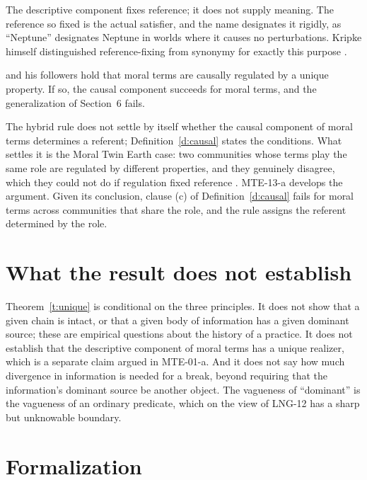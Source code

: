 \documentclass{situationist-preprint}
\begin{document}
\begin{reply}
The descriptive component fixes reference; it does not supply meaning. The reference so fixed is the actual satisfier, and the name designates it rigidly, as \enquote{Neptune} designates Neptune in worlds where it causes no perturbations. Kripke himself distinguished reference-fixing from synonymy for exactly this purpose \citep[Lecture~I]{Kripke1980}.
\end{reply}

\begin{objection}
\citet{Boyd1988} and his followers hold that moral terms are causally regulated by a unique property. If so, the causal component succeeds for moral terms, and the generalization of Section~6 fails.
\end{objection}

\begin{reply}
The hybrid rule does not settle by itself whether the causal component of moral terms determines a referent; Definition~\ref{d:causal} states the conditions. What settles it is the Moral Twin Earth case: two communities whose terms play the same role are regulated by different properties, and they genuinely disagree, which they could not do if regulation fixed reference \citep{HorganTimmons1991}. MTE-13-a develops the argument. Given its conclusion, clause (c) of Definition~\ref{d:causal} fails for moral terms across communities that share the role, and the rule assigns the referent determined by the role.
\end{reply}

\section{What the result does not establish}

Theorem~\ref{t:unique} is conditional on the three principles. It does not show that a given chain is intact, or that a given body of information has a given dominant source; these are empirical questions about the history of a practice. It does not establish that the descriptive component of moral terms has a unique realizer, which is a separate claim argued in MTE-01-a. And it does not say how much divergence in information is needed for a break, beyond requiring that the information's dominant source be another object. The vagueness of \enquote{dominant} is the vagueness of an ordinary predicate, which on the view of LNG-12 has a sharp but unknowable boundary.

\section{Formalization}
\end{document}
